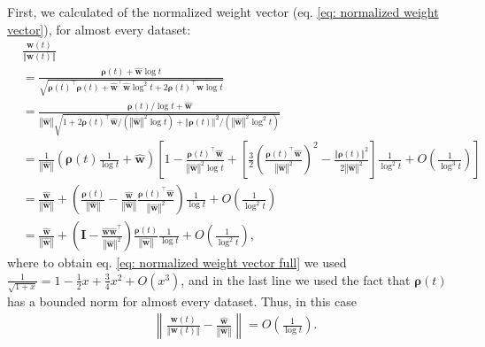 \documentclass[twoside,11pt,english]{article}
\newcommand{\norm}[1]{\left\lVert{#1}\right\rVert}
\begin{document}
First, we calculated of the normalized weight vector (eq. \ref{eq: normalized weight vector}), for almost every dataset:
\begin{align}
 & \frac{\mathbf{w}\left(t\right)}{\left\Vert \mathbf{w}\left(t\right)\right\Vert }\nonumber \\
 & =\frac{\boldsymbol{\rho}\left(t\right)+\hat{\mathbf{w}}\log t}{\sqrt{\boldsymbol{\rho}\left(t\right)^{\top}\boldsymbol{\rho}\left(t\right)+\hat{\mathbf{w}}^{\top}\hat{\mathbf{w}}\log^{2}t+2\boldsymbol{\rho}\left(t\right)^{\top}\hat{\mathbf{w}}\log t}}\nonumber \\
 & =\frac{\boldsymbol{\rho}\left(t\right)/\log t+\hat{\mathbf{w}}}{\left\Vert \hat{\mathbf{w}}\right\Vert \sqrt{1+2\boldsymbol{\rho}\left(t\right)^{\top}\hat{\mathbf{w}}/\left(\left\Vert \hat{\mathbf{w}}\right\Vert ^{2}\log t\right)+\left\Vert \boldsymbol{\rho}\left(t\right)\right\Vert ^{2}/\left(\left\Vert \hat{\mathbf{w}}\right\Vert ^{2}\log^{2}t\right)}}\nonumber \\
 & =\frac{1}{\left\Vert \hat{\mathbf{w}}\right\Vert }\left(\boldsymbol{\rho}\left(t\right)\frac{1}{\log t}+\hat{\mathbf{w}}\right)\left[1-\frac{\boldsymbol{\rho}\left(t\right)^{\top}\hat{\mathbf{w}}}{\left\Vert \hat{\mathbf{w}}\right\Vert ^{2}\log t}+\left[\frac{3}{2}\left(\frac{\boldsymbol{\rho}\left(t\right)^\top\hat{\mathbf{w}}}{\left\Vert \hat{\mathbf{w}}\right\Vert ^{2}}\right)^{2}-\frac{\left\Vert \boldsymbol{\rho}\left(t\right)\right\Vert ^{2}}{2\left\Vert \hat{\mathbf{w}}\right\Vert ^{2}}\right]\frac{1}{\log^{2}t}+O\left(\frac{1}{\log^{3}t}\right)\right]\label{eq: normalized weight vector full}\\
 & =\frac{\hat{\mathbf{w}}}{\left\Vert \hat{\mathbf{w}}\right\Vert }+\left(\frac{\boldsymbol{\rho}\left(t\right)}{\left\Vert \hat{\mathbf{w}}\right\Vert }-\frac{\hat{\mathbf{w}}}{\left\Vert \hat{\mathbf{w}}\right\Vert }\frac{\boldsymbol{\rho}\left(t\right)^{\top}\hat{\mathbf{w}}}{\left\Vert \hat{\mathbf{w}}\right\Vert ^{2}}\right)\frac{1}{\log t}+O\left(\frac{1}{\log^{2}t}\right)\nonumber \\
 & =\frac{\hat{\mathbf{w}}}{\left\Vert \hat{\mathbf{w}}\right\Vert }+\left(\mathbf{I}-\frac{\hat{\mathbf{w}}\hat{\mathbf{w}}^{\top}}{\left\Vert \hat{\mathbf{w}}\right\Vert ^{2}}\right)\frac{\boldsymbol{\rho}\left(t\right)}{\left\Vert \hat{\mathbf{w}}\right\Vert }\frac{1}{\log t}+O\left(\frac{1}{\log^{2}t}\right),\nonumber 
\end{align}
where to obtain eq. \ref{eq: normalized weight vector full} we used
$\frac{1}{\sqrt{1+x}}=1-\frac{1}{2}x+\frac{3}{4}x^{2}+O\left(x^{3}\right)$, 
and in the last line we used the fact that $\boldsymbol{\rho}\left(t\right)$
has a bounded norm for almost every dataset. Thus, in this case
\begin{align}
 & \norm{\frac{\mathbf{w}\left(t\right)}{\left\Vert \mathbf{w}\left(t\right)\right\Vert } - \frac{\hat{\mathbf{w}}}{\left\Vert \hat{\mathbf{w}}\right\Vert }} = O\left(\frac{1}{\log t}\right).\nonumber
\end{align} 
\end{document}
